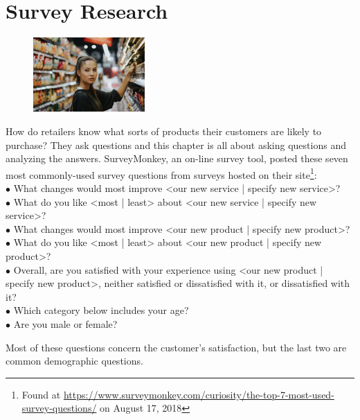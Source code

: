 \chapter{Survey Research}\label{08:surveys}

\begin{figure}
	\caption{} %
	\label{08:fig01} 
	\centering
	\includegraphics[width=0.38\textwidth]{gfx/08-01} 
\end{figure}

How do retailers know what sorts of products their customers are likely to purchase? They ask questions and this chapter is all about asking questions and analyzing the answers. SurveyMonkey, an on-line survey tool, posted these seven most commonly-used survey questions from surveys hosted on their site\footnote{Found at \url{https://www.surveymonkey.com/curiosity/the-top-7-most-used-survey-questions/} on August 17, 2018}:\\
$ \bullet $ What changes would most improve <our new service | specify new service>?\\
$ \bullet $ What do you like <most | least> about <our new service | specify new service>?\\
$ \bullet $ What changes would most improve <our new product | specify new product>?\\
$ \bullet $ What do you like <most | least> about <our new product | specify new product>?\\
$ \bullet $ Overall, are you satisfied with your experience using <our new product | specify new product>, neither satisfied or dissatisfied with it, or dissatisfied with it?\\
$ \bullet $ Which category below includes your age?\\
$ \bullet $ Are you male or female?

Most of these questions concern the customer's satisfaction, but the last two are common demographic questions. 

